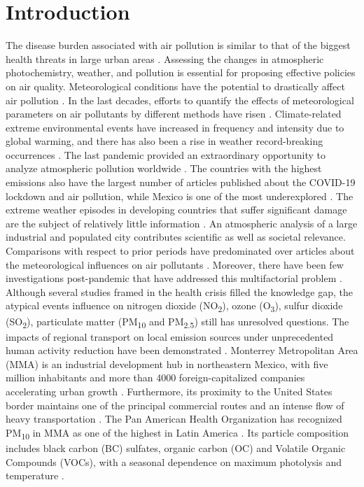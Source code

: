 \documentclass[preprint,12pt]{elsarticle}
\begin{document}
\section{Introduction}
The disease burden associated with air pollution is similar to that of the biggest health threats in large urban areas \citep{organization2021}. Assessing the changes in atmospheric photochemistry, weather, and pollution is essential for proposing effective policies on air quality. Meteorological conditions have the potential to drastically affect air pollution \citep{Zhang_2017}. In the last decades, efforts to quantify the effects of meteorological parameters on air pollutants by different methods have risen \citep{Shrestha_2022,Gong_2022,Ni_2023}. Climate-related extreme environmental events have increased in frequency and intensity due to global warming, and there has also been a rise in weather record-breaking occurrences \citep{Ni_2023,Clarke_2022,Swain_2020}. The last pandemic provided an extraordinary opportunity to analyze atmospheric pollution worldwide \citep{Kumari_2020,Barr__2021,Slezakova_2021,Saha_2022,Han_2022}. The countries with the highest emissions also have the largest number of articles published about the COVID-19 lockdown and air pollution, while Mexico is one of the most underexplored \citep{Aboagye}. The extreme weather episodes in developing countries that suffer significant damage are the subject of relatively little information \citep{Otto_2020}. An atmospheric analysis of a large industrial and populated city contributes scientific as well as societal relevance. Comparisons with respect to prior periods have predominated over articles about the meteorological influences on air pollutants \citep{Hernandez-Paniagua2021,Bontempi_2022,ZORAN,Priya}. Moreover, there have been few investigations post-pandemic that have addressed this multifactorial problem \citep{Agrawal_2024}. Although several studies framed in the health crisis filled the knowledge gap, the atypical events influence on nitrogen dioxide (NO\textsubscript{2}), ozone (O\textsubscript{3}), sulfur dioxide (SO\textsubscript{2}), particulate matter (PM\textsubscript{10} and PM\textsubscript{2.5}) still has unresolved questions. The impacts of regional transport on local emission sources under unprecedented human activity reduction have been demonstrated \citep{Shen_2021}. Monterrey Metropolitan Area (MMA) is an industrial development hub in northeastern Mexico, with five million inhabitants and more than 4000 foreign-capitalized companies accelerating urban growth \citep{20152018}. Furthermore, its proximity to the United States border maintains one of the principal commercial routes and an intense flow of heavy transportation \citep{cmm2019}. The Pan American Health Organization has recognized PM\textsubscript{10} in MMA as one of the highest in Latin America \citep{Riojas-Rodriguez2016}. Its particle composition includes black carbon (BC) \citep{Peralta_2019} sulfates, organic carbon (OC) \citep{Mancilla_2019} and Volatile Organic Compounds (VOCs), with a seasonal dependence on maximum photolysis and temperature \citep{Menchaca_Torre_2015}.
\end{document}
